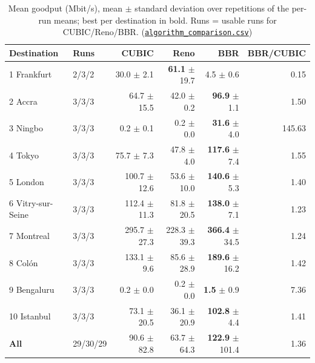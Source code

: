 \documentclass[10pt]{article}
\newcommand{\repo}{https://github.com/philwisniewski/cs-422-assignment-2}
\newcommand{\commit}{d1408ba303b1e3132ba5504e32ebf2ed3572d4e0}
\newcommand{\resurl}{\repo/tree/\commit/results/20261022-222609}
\begin{document}
\begin{table}[htbp]
\centering\small
\caption{Mean goodput (Mbit/s), mean $\pm$ standard deviation over repetitions of the per-run means; best per destination in bold. Runs = usable runs for CUBIC/Reno/BBR. (\href{\resurl/tables/algorithm_comparison.csv}{\texttt{algorithm\_comparison.csv}})}
\label{tab:cmpgp}
\begin{tabular}{@{}llrrrr@{}}
\toprule
Destination & Runs & CUBIC & Reno & BBR & BBR/CUBIC \\
\midrule
1 Frankfurt & 2/3/2 & 30.0 $\pm$ 2.1 & \textbf{61.1} $\pm$ 19.7 & 4.5 $\pm$ 0.6 & 0.15 \\
2 Accra & 3/3/3 & 64.7 $\pm$ 15.5 & 42.0 $\pm$ 0.2 & \textbf{96.9} $\pm$ 1.1 & 1.50 \\
3 Ningbo & 3/3/3 & 0.2 $\pm$ 0.1 & 0.2 $\pm$ 0.0 & \textbf{31.6} $\pm$ 4.0 & 145.63 \\
4 Tokyo & 3/3/3 & 75.7 $\pm$ 7.3 & 47.8 $\pm$ 4.0 & \textbf{117.6} $\pm$ 7.4 & 1.55 \\
5 London & 3/3/3 & 100.7 $\pm$ 12.6 & 53.6 $\pm$ 10.0 & \textbf{140.6} $\pm$ 5.3 & 1.40 \\
6 Vitry-sur-Seine & 3/3/3 & 112.4 $\pm$ 11.3 & 81.8 $\pm$ 20.5 & \textbf{138.0} $\pm$ 7.1 & 1.23 \\
7 Montreal & 3/3/3 & 295.7 $\pm$ 27.3 & 228.3 $\pm$ 39.3 & \textbf{366.4} $\pm$ 34.5 & 1.24 \\
8 Colón & 3/3/3 & 133.1 $\pm$ 9.6 & 85.6 $\pm$ 28.9 & \textbf{189.6} $\pm$ 16.2 & 1.42 \\
9 Bengaluru & 3/3/3 & 0.2 $\pm$ 0.0 & 0.2 $\pm$ 0.0 & \textbf{1.5} $\pm$ 0.9 & 7.36 \\
10 Istanbul & 3/3/3 & 73.1 $\pm$ 20.5 & 36.1 $\pm$ 20.9 & \textbf{102.8} $\pm$ 4.4 & 1.41 \\
\midrule
\textbf{All} & 29/30/29 & 90.6 $\pm$ 82.8 & 63.7 $\pm$ 64.3 & \textbf{122.9} $\pm$ 101.4 & 1.36 \\
\bottomrule
\end{tabular}
\end{table}
\end{document}

